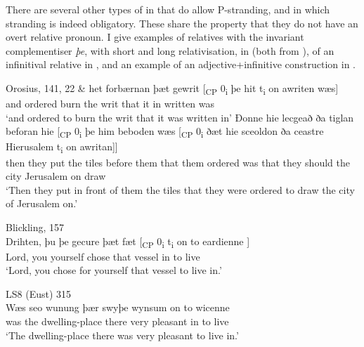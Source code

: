 \documentclass[output=paper]{langsci/langscibook}
\begin{document}
There are several other types of  in 
that do allow P-stranding, and in which stranding is indeed obligatory. These
share the property that they do not have an overt relative pronoun. I give
examples of relatives with the invariant complementiser \textit{þe}, with short
and long relativisation, in  (both from
\citealt[147--148]{vanKemenade1987}), of an infinitival relative in
, and an example of an adjective+infinitive construction in
.

\ea%
    \label{ex:key:11.3} Orosius, 141, 22 \parencite[147]{vanKemenade1987}
    \ea
	\gll \& het         forbærnan þæt gewrit [\textsubscript{CP} 0\textsubscript{i} þe   hit  t\textsubscript{i} on awriten wæs]\\
		and ordered burn          the   writ {} {}           that it  {}    in written   was\\
	\glt ‘and ordered to burn the writ that it was written in’
	\ex
	\gll Đonne hie lecgeað ða tiglan beforan  hie    [\textsubscript{CP} 0\textsubscript{i} þe    him beboden wæs [\textsubscript{CP} 0\textsubscript{i} ðæt hie sceoldon ða ceastre Hierusalem  t\textsubscript{i} on awritan]]\\
		then    they put     the tiles   before    them  {} {}        that  them ordered was {} {} that they should the city Jerusalem             {} on  draw\\
	\glt ‘Then they put in front of them the tiles that they were ordered to draw the city of Jerusalem on.’
	\z
\z

\ea Blickling, 157 \parencite[151]{vanKemenade1987}\label{ex:key:11.4}\\
    \gll Drihten, þu   þe           gecure þæt fæt      [\textsubscript{CP} 0\textsubscript{i}     t\textsubscript{i} on to eardienne ]\\
        Lord,      you yourself chose   that vessel  {} {} {}                  in to live\\
    \glt ‘Lord, you chose for yourself that vessel to live in.’
\z

\ea LS8 (Eust) 315 \parencite[266]{Fischeretal:2000}%
    \label{ex:key:11.5}\\
    \gll Wæs seo wunung       þær    swyþe wynsum on  to wicenne \\
        was the dwelling-place  there very   pleasant  in  to live\\
    \glt `The dwelling-place there was very pleasant to live in.'
\z
\end{document}
